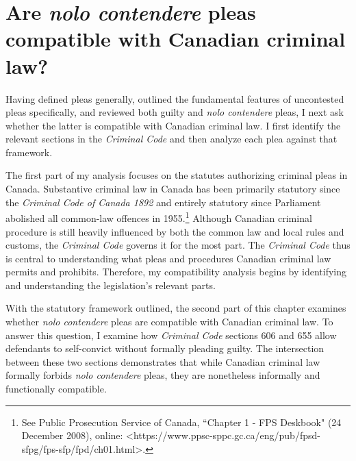 \chapter{Are \textit{nolo contendere} pleas compatible with Canadian criminal law?}

\setcounter{footnote}{94}

Having defined pleas generally, outlined the fundamental features of uncontested pleas specifically, and reviewed both guilty and \textit{nolo contendere} pleas, I next ask whether the latter is compatible with Canadian criminal law. I first identify the relevant sections in the \textit{Criminal Code} and then analyze each plea against that framework. 

The first part of my analysis focuses on the statutes authorizing criminal pleas in Canada. Substantive criminal law in Canada has been primarily statutory since the \textit{Criminal Code of Canada 1892} and entirely statutory since Parliament abolished all common-law offences in 1955.\footnote{See Public Prosecution Service of Canada, ``Chapter 1 - FPS Deskbook" (24 December 2008), online: \textless https://www.ppsc-sppc.gc.ca/eng/pub/fpsd-sfpg/fps-sfp/fpd/ch01.html\textgreater.} Although Canadian criminal procedure is still heavily influenced by both the common law and local rules and customs, the \textit{Criminal Code} governs it for the most part. The \textit{Criminal Code} thus is central to understanding what pleas and procedures Canadian criminal law permits and prohibits. Therefore, my compatibility analysis begins by identifying and understanding the legislation's relevant parts. 

With the statutory framework outlined, the second part of this chapter examines whether \textit{nolo contendere} pleas are compatible with Canadian criminal law. To answer this question, I examine how \textit{Criminal Code} sections 606 and 655 allow defendants to self-convict without formally pleading guilty. The intersection between these two sections demonstrates that while Canadian criminal law formally forbids \textit{nolo contendere} pleas, they are nonetheless informally and functionally compatible.